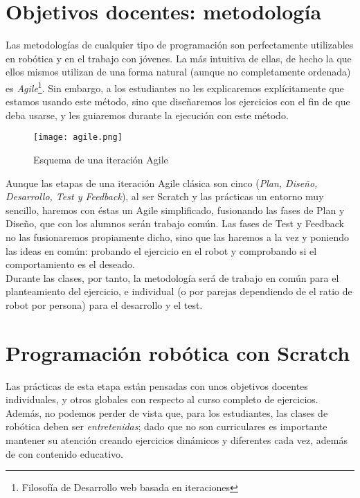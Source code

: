 \section{Objetivos docentes: metodología}\label{sec:metodología}
Las metodologías de cualquier tipo de programación son perfectamente utilizables en robótica y en el trabajo con jóvenes. La más intuitiva de ellas, de hecho la que ellos mismos utilizan de una forma natural (aunque no completamente ordenada) es \textit{Agile}\footnote{Filosofía de Desarrollo web basada en iteraciones}. Sin embargo, a los estudiantes no les explicaremos explícitamente que estamos usando este método, sino que diseñaremos los ejercicios con el fin de que deba usarse, y les guiaremos durante la ejecución con este método. 
\begin{figure}[h]
	\centering
	\texttt{[image: agile.png]}
	\label{img:agile}
	\caption{Esquema de una iteración Agile}
\end{figure}
Aunque las etapas de una iteración Agile clásica son cinco (\textit{Plan, Diseño, Desarrollo, Test y Feedback}), al ser Scratch y las prácticas un entorno muy sencillo, haremos con éstas un Agile simplificado, fusionando las fases de Plan y Diseño, que con los alumnos serán trabajo común. Las fases de Test y Feedback no las fusionaremos propiamente dicho, sino que las haremos a la vez y poniendo las ideas en común: probando el ejercicio en el robot y comprobando si el comportamiento es el deseado. \\
Durante las clases, por tanto, la metodología será de trabajo en común para el planteamiento del ejercicio, e individual (o por parejas dependiendo de el ratio de robot por persona) para el desarrollo y el test.
\section{Programación robótica con Scratch}\label{sec:scratch}
Las prácticas de esta etapa están pensadas con unos objetivos docentes individuales, y otros globales con respecto al curso completo de ejercicios. Además, no podemos perder de vista que, para los estudiantes, las clases de robótica deben ser \textit{entretenidas}; dado que no son curriculares es importante mantener su atención creando ejercicios dinámicos y diferentes cada vez, además de con contenido educativo. 
